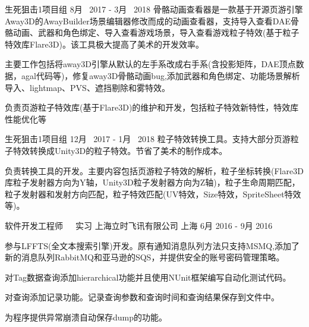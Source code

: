 \begin{cventries}
\cventryproject
{生死狙击1项目组} %
{8月~ 2017 - 3月~ 2018} %
{骨骼动画查看器是一款基于开源页游引擎Away3D的AwayBuilder场景编辑器修改而成的动画查看器，支持导入查看DAE骨骼动画、武器和角色绑定、导入查看游戏场景，导入查看游戏粒子特效(基于粒子特效库Flare3D)。该工具极大提高了美术的开发效率。}
{ %
	\begin{cvitems}
		\item {主要工作包括将away3D引擎从默认的左手系改成右手系(含投影矩阵，DAE顶点数据，agal代码等)，修复away3D骨骼动画bug,添加武器和角色绑定、功能场景解析导入、lightmap、PVS、遮挡剔除和雾特效。}
		\item {负责页游粒子特效库(基于Flare3D)的维护和开发，包括粒子特效新特性，特效库性能优化等}
	\end{cvitems}
}
\cventryproject
{生死狙击1项目组} %
{12月~ 2017 - 1月~ 2018} %
{粒子特效转换工具。支持大部分页游粒子特效转换成Unity3D的粒子特效。节省了美术的制作成本。}
{ %
	\begin{cvitems}
		\item {负责转换工具的开发。主要内容包括页游粒子特效的解析，粒子坐标转换(Flare3D库粒子发射器方向为Y轴，Unity3D粒子发射器方向为Z轴)，粒子生命周期匹配，粒子发射器和发射方向匹配，粒子特效匹配(UV特效，Size特效，SpriteSheet特效等)。}
	\end{cvitems}
}
\cventry
{软件开发工程师~~~实习} %
{上海立时飞讯有限公司} %
{上海} %
{6月 2016 - 9月 2016} %
{ %
\begin{cvitems}
\item {参与LFFTS(全文本搜索引擎)开发。原有通知消息队列方法只支持MSMQ,添加了新的消息队列RabbitMQ和亚马逊的SQS，并提供安全的账号密码管理策略。}
\item {对Tag数据查询添加hierarchical功能并且使用NUnit框架编写自动化测试代码。}
\item {对查询添加记录功能。记录查询参数和查询时间和查询结果保存到文件中。}
\item {为程序提供异常崩溃自动保存dump的功能。}
\end{cvitems}
}


\end{cventries}

